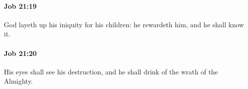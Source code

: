 		\paragraph{Job 21:19} %
			\label{JOB-21-19}

			God layeth up his iniquity for his children: he rewardeth him, and he shall know it.


		\paragraph{Job 21:20} %
			\label{JOB-21-20}

			His eyes shall see his destruction, and he shall drink of the wrath of the Almighty.


